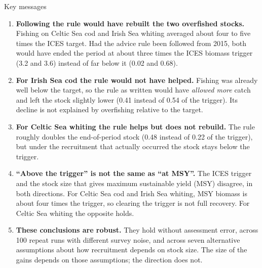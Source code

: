\documentclass[11pt,a4paper]{article}
\begin{document}
\begin{keybox}{Key messages}
\begin{enumerate}[leftmargin=1.4em]
\item \textbf{Following the rule would have rebuilt the two overfished stocks.}
Fishing on Celtic Sea cod and Irish Sea whiting averaged about four to
five times the ICES target. Had the advice rule been followed from 2015,
both would have ended the period at about three times the ICES biomass
trigger (3.2 and 3.6) instead of far below it (0.02 and 0.68).
\item \textbf{For Irish Sea cod the rule would not have helped.} Fishing was
already well below the target, so the rule as written would have
\emph{allowed more} catch and left the stock slightly lower (0.41 instead
of 0.54 of the trigger). Its decline is not explained by overfishing
relative to the target.
\item \textbf{For Celtic Sea whiting the rule helps but does not rebuild.}
The rule roughly doubles the end-of-period stock (0.48 instead of 0.22 of
the trigger), but under the recruitment that actually occurred the stock
stays below the trigger.
\item \textbf{``Above the trigger'' is not the same as ``at MSY''.}
The ICES trigger and the stock size that gives maximum sustainable yield
(MSY) disagree, in both directions. For Celtic Sea cod and Irish Sea
whiting, MSY biomass is about four times the trigger, so clearing the
trigger is not full recovery. For Celtic Sea whiting the opposite holds.
\item \textbf{These conclusions are robust.} They hold without assessment
error, across 100 repeat runs with different survey noise, and across seven
alternative assumptions about how recruitment depends on stock size.
The size of the gains depends on those assumptions; the direction does not.
\end{enumerate}
\end{keybox}
\end{document}
